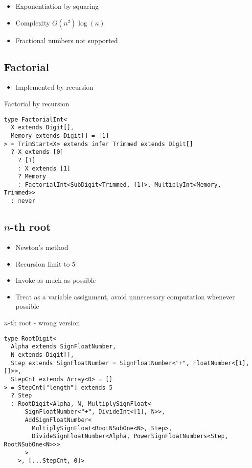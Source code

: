 \begin{itemize}
  \item Exponentiation by squaring
  \item Complexity $O(n^2)\log(n)$
  \item Fractional numbers not supported 
\end{itemize}

\subsection{Factorial}

\begin{itemize}
  \item Implemented by recursion
\end{itemize}

\begin{listing}[ht]
\caption{Factorial by recursion}\label{lst:factorial-recursion}
\begin{verbatim}
type FactorialInt<
  X extends Digit[],
  Memory extends Digit[] = [1]
> = TrimStart<X> extends infer Trimmed extends Digit[]
  ? X extends [0]
    ? [1]
    : X extends [1]
    ? Memory
    : FactorialInt<SubDigit<Trimmed, [1]>, MultiplyInt<Memory, Trimmed>>
  : never
\end{verbatim}
\end{listing}

\subsection{$n$-th root}

\begin{itemize}
  \item Newton's method
  \item Recursion limit to 5
  \item Invoke  as much as possible
  \item Treat  as a variable assignment, avoid unnecessary computation whenever possible
\end{itemize}

\begin{listing}[ht]
\caption{$n$-th root - wrong version}\label{lst:root-wrong}
\begin{verbatim}
type RootDigit<
  Alpha extends SignFloatNumber,
  N extends Digit[],
  Step extends SignFloatNumber = SignFloatNumber<"+", FloatNumber<[1], []>>,
  StepCnt extends Array<0> = []
> = StepCnt["length"] extends 5
  ? Step
  : RootDigit<Alpha, N, MultiplySignFloat<
      SignFloatNumber<"+", DivideInt<[1], N>>,
      AddSignFloatNumber<
        MultiplySignFloat<RootNSubOne<N>, Step>,
        DivideSignFloatNumber<Alpha, PowerSignFloatNumbers<Step, RootNSubOne<N>>>
      >
    >, [...StepCnt, 0]>
\end{verbatim}
\end{listing}

